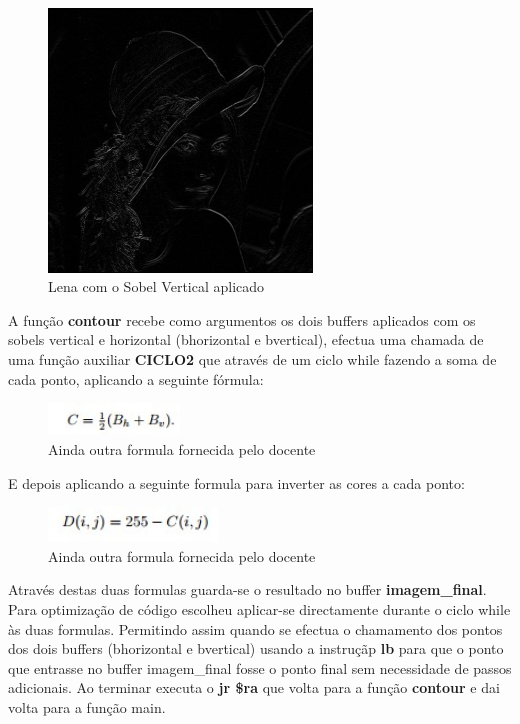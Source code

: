 \documentclass[a4paper,11pt]{article}
\begin{document}
\begin{figure}[ht!]
\centering
\includegraphics[width=70mm]{Lena(SVertical)}
\caption{Lena com o Sobel Vertical aplicado}
\label{overflow}
\end{figure}

\newpage

\newline
\newline
\indent A função {\bf contour} recebe como argumentos os dois buffers aplicados com os sobels vertical e horizontal (bhorizontal e bvertical), efectua uma chamada de uma função auxiliar {\bf CICLO2} que através de um ciclo while fazendo a soma de cada ponto, aplicando a seguinte fórmula:

\begin{figure}[ht!]
\centering
\includegraphics[width=35mm]{formula3}
\caption{Ainda outra formula fornecida pelo docente}
\label{overflow}
\end{figure}

E depois aplicando a seguinte formula para inverter as cores a cada ponto:

\begin{figure}[ht!]
\centering
\includegraphics[width=45mm]{formula4}
\caption{Ainda outra formula fornecida pelo docente}
\label{overflow}
\end{figure}

Através destas duas formulas guarda-se o resultado no buffer {\bf imagem\_final}.
\newline
\indent Para optimização de código escolheu aplicar-se directamente durante o ciclo while às duas formulas. Permitindo assim quando se efectua o chamamento dos pontos dos dois buffers (bhorizontal e bvertical) usando a instruçãp {\bf lb} para que o ponto que entrasse no buffer imagem\_final fosse o ponto final sem necessidade de passos adicionais. Ao terminar executa o {\bf jr \$ra} que volta para a função {\bf contour} e dai volta para a função main.
\newline
\end{document}
